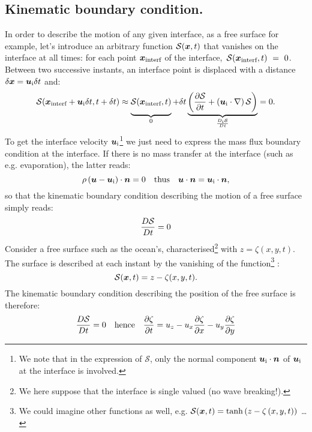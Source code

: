 \subsection{Kinematic boundary condition.} In order to describe the motion of any given interface, as a free surface for example, let's introduce an arbitrary function $\mathcal S(\bx,t)$ that vanishes on the interface at all times: for each point $\bx_\text{interf}$ of the interface,~$\mathcal S(\bx_\text{interf},t)~=~0$. Between two successive instants, an interface point is displaced with a distance $\delbx = \bu_\text i \delt$ and:
$$
\mathcal S(\bx_\text{interf} + \bu_\text i \delt, t + \delt) \approx \underbrace{\vphantom{\lp\pd{\mathcal S}{t}\rp}\mathcal S(\bx_\text{interf},t)}_0 + \delt\underbrace{\lp\pd{\mathcal S}{t} + \lp\bu_\text  i \cdot \nabla\rp\mathcal S\rp}_{\D{_\text i\mathcal S}{t}} = 0.
$$
To get the interface velocity $\bu_\text i$\footnote{We note that in the expression of $\mathcal S$, only the normal component $\bu_\text i \cdot \bn$ of $\bu_\text i$ at the interface is involved.} we just need to express the mass flux boundary condition at the interface. If there is no mass transfer at the interface (such as e.g. evaporation), the latter reads:
\begin{equation}
\rho \lp \bu - \bu_\text i\rp \cdot \bn = 0 \quad \text{thus} \quad \bu \cdot \bn = \bu_\text i \cdot \bn,
\end{equation}
so that the kinematic boundary condition describing the motion of a free surface simply reads:
\begin{equation}
\frac{D \mathcal S}{D t} = 0
\end{equation}
 Consider a free surface such as the ocean's, characterised\footnote{We here suppose that the interface is single valued (no wave breaking!).} with $z = \zeta(x,y,t)$. The surface is described at each instant by the vanishing of the function\footnote{We could imagine other functions as well, e.g. $\mathcal S(\bx,t) = \tanh\lp z - \zeta\lp x,y,t\rp\rp$ \ldots} :
\begin{equation}
\mathcal S(\bx,t) = z - \zeta(x,y,t).
\label{eq:bumped_free_surface}
\end{equation}
The kinematic boundary condition describing the position of the free surface is therefore:
\begin{equation}
\frac{D \mathcal S}{D t} = 0 \quad \text{hence}\quad \frac{\partial \zeta}{\partial t} = u_z - u_x \frac{\partial \zeta}{\partial x} - u_y \frac{\partial \zeta}{\partial y}
\end{equation}
